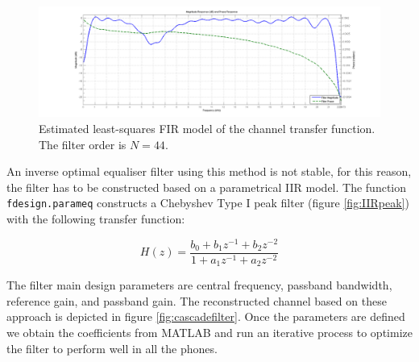 \documentclass[12pt,a4paper,openright]{report}
\begin{document}
 
\begin{figure}[h]
  \centering
    \includegraphics[width=1\textwidth]{FIRChanRespose.png}
    \caption[Estimated least-squares FIR model for the channel transfer function]{Estimated least-squares FIR model of the channel transfer function. The filter order is $N=44$.}
    \label{fig:FIRtf}
\end{figure}

An inverse optimal equaliser filter using this method is not stable, for this reason, the filter has to be constructed based on a parametrical IIR model. The function \texttt{fdesign.parameq} constructs a Chebyshev Type I peak filter (figure   \ref{fig:IIRpeak}) with the following transfer function:

\begin{equation}
H\left( z \right) = \frac{{{b_0} + {b_1}{z^{ - 1}} + {b_2}{z^{ - 2}}}}{{1 + {a_1}{z^{ - 1}} + {a_2}{z^{ - 2}}}}
\end{equation}

The filter main design parameters are central frequency, passband bandwidth, reference gain, and passband gain. The reconstructed channel based on these approach is depicted in figure \ref{fig:cascadefilter}. Once the parameters are defined we obtain the coefficients from MATLAB and run an iterative process to optimize the filter to perform well in all the phones.
\end{document}
